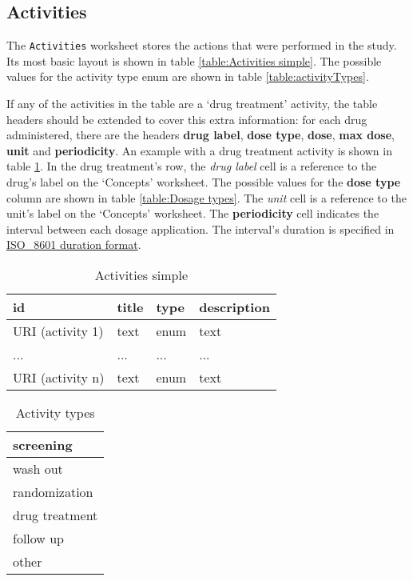 \documentclass[a4paper,10pt]{article}
\begin{document}
\subsection{Activities}
The \texttt{Activities} worksheet stores the actions that were performed in the study. Its most basic layout is shown in table \ref{table:Activities simple}. The possible values for the activity type enum are shown in table \ref{table:activityTypes}.

If any of the activities in the table are a `drug treatment' activity, the table headers should be extended to cover this extra information: for each drug administered, there are the headers \textbf{drug label}, \textbf{dose type}, \textbf{dose}, \textbf{max dose}, \textbf{unit} and \textbf{periodicity}. An example with a drug treatment activity is shown in table \ref{table:Activities complex}. In the drug treatment's row, the \textit{drug label} cell is a reference to the drug's label on the `Concepts' worksheet. The possible values for the \textbf{dose type} column are shown in table \ref{table:Dosage types}. The \textit{unit} cell is a reference to the unit's label on the `Concepts' worksheet. The \textbf{periodicity} cell indicates the interval between each dosage application. The interval's duration is specified in \href{https://en.wikipedia.org/wiki/ISO_8601#Durations}{ISO_8601 duration format}.

\begin{table}[h]
  \centering
  \caption{Activities simple}
  \small
  \label{table:Activities complex}
  \begin{tabular}{|l|l|l|l|}
    \hline
    \textbf{id} & \textbf{title} & \textbf{type} & \textbf{description} \\ \hline
    URI (activity 1) & text           & enum & text \\ \hline
    ...              & ...            & ...  & ...  \\ \hline
    URI (activity n) & text           & enum & text \\ \hline
  \end{tabular}
\end{table}

\begin{table}[h]
  \centering
  \caption{Activity types}
  \small
  \label{table:Activity types}
  \begin{tabular}{|l|}
    \hline
    screening \\ \hline
    wash out \\ \hline
    randomization \\ \hline
    drug treatment \\ \hline
    follow up \\ \hline
    other \\ \hline
  \end{tabular}
\end{table}
\end{document}
